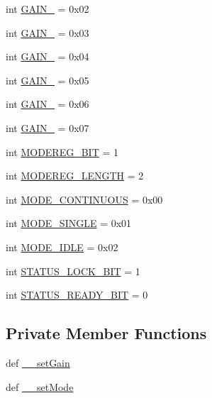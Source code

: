\begin{DoxyCompactItemize}
\item 
int \hyperlink{classlibsensorPy_1_1concretesensor_1_1hmc5883l_1_1HMC5883L_abe12e97d344329ad9a8fe937dec628ce}{G\+A\+I\+N\+\_} = 0x02
\item 
int \hyperlink{classlibsensorPy_1_1concretesensor_1_1hmc5883l_1_1HMC5883L_a9d75a1285b1d8d8371381742b9532026}{G\+A\+I\+N\+\_} = 0x03
\item 
int \hyperlink{classlibsensorPy_1_1concretesensor_1_1hmc5883l_1_1HMC5883L_a9f9475ae46e41b82863b1082a388a17b}{G\+A\+I\+N\+\_} = 0x04
\item 
int \hyperlink{classlibsensorPy_1_1concretesensor_1_1hmc5883l_1_1HMC5883L_aa347c75ee7420b418097947192c4d63d}{G\+A\+I\+N\+\_} = 0x05
\item 
int \hyperlink{classlibsensorPy_1_1concretesensor_1_1hmc5883l_1_1HMC5883L_a82c08ecfe411a5a6b6bbb2d327b5ebb8}{G\+A\+I\+N\+\_} = 0x06
\item 
int \hyperlink{classlibsensorPy_1_1concretesensor_1_1hmc5883l_1_1HMC5883L_a325a3437de8d8572ac39237820cdbd97}{G\+A\+I\+N\+\_} = 0x07
\item 
int \hyperlink{classlibsensorPy_1_1concretesensor_1_1hmc5883l_1_1HMC5883L_ae11ba6a69c2897528267a21fa00fa966}{M\+O\+D\+E\+R\+E\+G\+\_\+\+B\+I\+T} = 1
\item 
int \hyperlink{classlibsensorPy_1_1concretesensor_1_1hmc5883l_1_1HMC5883L_a345d133da92b344591d7383464b3749a}{M\+O\+D\+E\+R\+E\+G\+\_\+\+L\+E\+N\+G\+T\+H} = 2
\item 
int \hyperlink{classlibsensorPy_1_1concretesensor_1_1hmc5883l_1_1HMC5883L_abf72ab6c82b8b3c156f25216894d27f1}{M\+O\+D\+E\+\_\+\+C\+O\+N\+T\+I\+N\+U\+O\+U\+S} = 0x00
\item 
int \hyperlink{classlibsensorPy_1_1concretesensor_1_1hmc5883l_1_1HMC5883L_ab47fb2908e1bfedc5ed35a11f91e1954}{M\+O\+D\+E\+\_\+\+S\+I\+N\+G\+L\+E} = 0x01
\item 
int \hyperlink{classlibsensorPy_1_1concretesensor_1_1hmc5883l_1_1HMC5883L_a63e4b52febba714578d1a8abbb6f1b21}{M\+O\+D\+E\+\_\+\+I\+D\+L\+E} = 0x02
\item 
int \hyperlink{classlibsensorPy_1_1concretesensor_1_1hmc5883l_1_1HMC5883L_a76b463a75394a62ca025464bfd53a30a}{S\+T\+A\+T\+U\+S\+\_\+\+L\+O\+C\+K\+\_\+\+B\+I\+T} = 1
\item 
int \hyperlink{classlibsensorPy_1_1concretesensor_1_1hmc5883l_1_1HMC5883L_a58909aeda669817aa37bd9d0b3c9300a}{S\+T\+A\+T\+U\+S\+\_\+\+R\+E\+A\+D\+Y\+\_\+\+B\+I\+T} = 0
\end{DoxyCompactItemize}
\subsection*{Private Member Functions}
\begin{DoxyCompactItemize}
\item 
def \hyperlink{classlibsensorPy_1_1concretesensor_1_1hmc5883l_1_1HMC5883L_a7e98ac04628a14a90e4936b22053dc4b}{\+\_\+\+\_\+set\+Gain}
\item 
def \hyperlink{classlibsensorPy_1_1concretesensor_1_1hmc5883l_1_1HMC5883L_a96cf6a7c24b00c1de0f3824a9078b7b4}{\+\_\+\+\_\+set\+Mode}
\end{DoxyCompactItemize}
